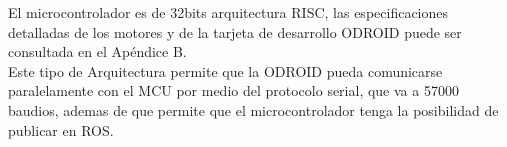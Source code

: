 El microcontrolador es de 32bits arquitectura RISC, las especificaciones detalladas de los motores y de la tarjeta de desarrollo
ODROID puede ser consultada en el Apéndice B.\\
Este tipo de Arquitectura permite que la ODROID pueda comunicarse paralelamente con el MCU por medio del protocolo serial, que va
a 57000 baudios, ademas de que permite que el microcontrolador tenga la posibilidad de publicar en ROS.



